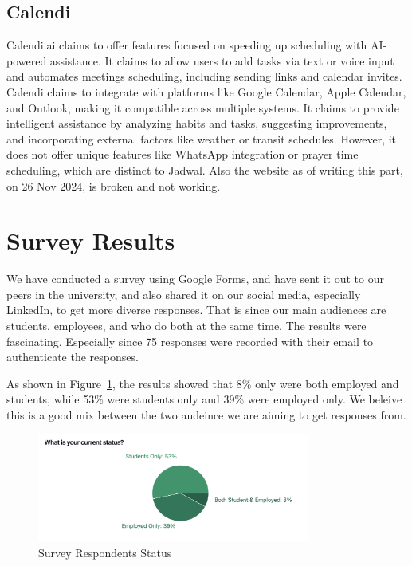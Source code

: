 \documentclass[12pt,a4paper]{report}
\begin{document}
\subsection{Calendi}

Calendi.ai claims to offer features focused on speeding up scheduling with AI-powered assistance. It claims to allow users to add tasks via text or voice input and automates meetings scheduling, including sending links and calendar invites. Calendi claims to integrate with platforms like Google Calendar, Apple Calendar, and Outlook, making it compatible across multiple systems. It claims to provide intelligent assistance by analyzing habits and tasks, suggesting improvements, and incorporating external factors like weather or transit schedules. However, it does not offer unique features like WhatsApp integration or prayer time scheduling, which are distinct to Jadwal. Also the website as of writing this part, on 26 Nov 2024, is broken and not working.

\section{Survey Results}

We have conducted a survey using Google Forms, and have sent it out to our peers in the university, and also shared it on our social media, especially LinkedIn, to get more diverse responses. That is since our main audiences are students, employees, and who do both at the same time. The results were fascinating. Especially since 75 responses were recorded with their email to authenticate the responses.

As shown in Figure~\ref{fig:survey-status}, the results showed that 8\% only were both employed and students, while 53\% were students only and 39\% were employed only. We beleive this is a good mix between the two audeince we are aiming to get responses from.

\begin{figure}[!h]
    \centering
    \includegraphics[width=0.8\textwidth]{images/survey/status.png}
    \caption{Survey Respondents Status}
    \label{fig:survey-status}
\end{figure}
\end{document}
